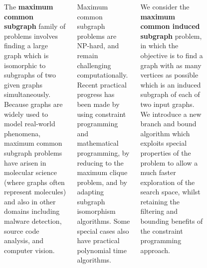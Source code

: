 \documentclass[a0paper]{tikzposter}
\begin{document}
\begin{columns}
{\begin{figure}
\end{figure}

The \textbf{maximum common subgraph} family of problems involves finding a large
graph which is isomorphic to subgraphs of two given graphs simultaneously.
Because graphs are widely used to model real-world phenomena, maximum common
subgraph problems have arisen in molecular science (where graphs often represent
molecules)
and also in other domains including malware detection, source code analysis, and computer vision.

\bigskip

Maximum common subgraph problems are NP-hard, and remain challenging
computationally. Recent practical progress has been made by using constraint
programming and
mathematical programming, by reducing
to the maximum clique problem, and by
adapting subgraph isomorphism algorithms. Some
special cases also have practical polynomial time algorithms.

\bigskip

We consider the \textbf{maximum common induced subgraph} problem, in
which the objective is to find a graph with as many vertices as possible which
is an induced subgraph of each of two input graphs.  We introduce
a new branch and bound algorithm which exploits special properties of the
problem to allow a much faster exploration of the search space, whilst
retaining the filtering and bounding benefits of the constraint programming
approach. 
}

\end{columns}
\end{document}

